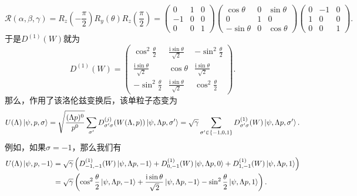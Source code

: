 \begin{equation*}
	\mathscr{R}( \alpha ,\beta ,\gamma ) =R_{z}\left( -\frac{\pi }{2}\right) R_{y}( \theta ) R_{z}\left(\frac{\pi }{2}\right) =\begin{pmatrix}
		0 & 1 & 0\\
		-1 & 0 & 0\\
		0 & 0 & 1
	\end{pmatrix}\begin{pmatrix}
		\cos \theta  & 0 & \sin \theta \\
		0 & 1 & 0\\
		-\sin \theta  & 0 & \cos \theta 
	\end{pmatrix}\begin{pmatrix}
		0 & -1 & 0\\
		1 & 0 & 0\\
		0 & 0 & 1
	\end{pmatrix} .
\end{equation*}
于是$D^{( 1)}( W)$就为
\begin{equation*}
	D^{( 1)} (W)=\left(\begin{matrix}
		\cos^{2}\frac{\theta }{2} & \frac{\mathrm{i}\sin \theta }{\sqrt{2}} & -\sin^{2}\frac{\theta }{2}\\
		\frac{\mathrm{i}\sin \theta }{\sqrt{2}} & \cos \theta  & \frac{\mathrm{i}\sin \theta }{\sqrt{2}}\\
		-\sin^{2}\frac{\theta }{2} & \frac{\mathrm{i}\sin \theta }{\sqrt{2}} & \cos^{2}\frac{\theta }{2}
	\end{matrix}\right) .
\end{equation*}
那么，作用了该洛伦兹变换后，该单粒子态变为
\begin{equation*}
	U( \Lambda )\ket{\psi ,p,\sigma } =\sqrt{\frac{( \Lambda p)^{0}}{p^{0}}}\sum _{\sigma '} D_{\sigma '\sigma }^{( j)}( W( \Lambda ,p))\ket{\psi ,\Lambda p,\sigma '} =\sqrt{\gamma }\sum _{\sigma '\in \{-1,0,1\}} D_{\sigma '\sigma }^{( 1)}( W)\ket{\psi ,\Lambda p,\sigma '} .
\end{equation*}
例如，如果$\sigma =-1$，那么我们有
\begin{equation*}
	\begin{aligned}
		U( \Lambda )\ket{\psi ,p,-1} & =\sqrt{\gamma }\left( D_{-1,-1}^{( 1)}( W)\ket{\psi ,\Lambda p,-1} +D_{0,-1}^{( 1)}( W)\ket{\psi ,\Lambda p,0} +D_{1,-1}^{( 1)}( W)\ket{\psi ,\Lambda p,1}\right)\\
		& =\sqrt{\gamma }\left(\cos^{2}\frac{\theta }{2}\ket{\psi ,\Lambda p,-1} +\frac{\mathrm{i}\sin \theta }{\sqrt{2}}\ket{\psi ,\Lambda p,-1} -\sin^{2}\frac{\theta }{2}\ket{\psi ,\Lambda p,1}\right) .
	\end{aligned}
\end{equation*}

